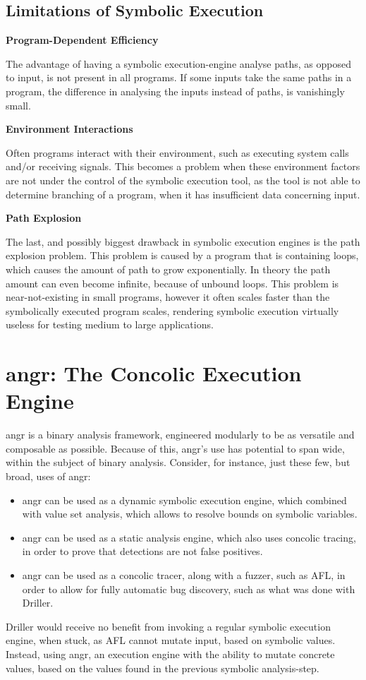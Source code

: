 \documentclass[a4paper]{article}
\newcommand{\tbf}[1]{\textbf{#1}}
\newcommand{\subsubsubsection}[1]{\tbf{#1}}
\newcommand{\marginwidth}{0.5cm}
\begin{document}
\subsection{Limitations of Symbolic Execution}
\label{sec:LimitsSymEx}
\subsubsubsection{Program-Dependent Efficiency}
\begin{addmargin}[\marginwidth]{0cm}
The advantage of having a symbolic execution-engine analyse paths, as opposed to input, is not present in all programs. If some inputs take the same paths in a program, the difference in analysing the inputs instead of paths, is vanishingly small.
\end{addmargin}
\subsubsubsection{Environment Interactions}
\begin{addmargin}[\marginwidth]{0cm}
Often programs interact with their environment, such as executing system calls and/or receiving signals. This becomes a problem when these environment factors are not under the control of the symbolic execution tool, as the tool is not able to determine branching of a program, when it has insufficient data concerning input.
\end{addmargin}
\subsubsubsection{Path Explosion}
\begin{addmargin}[\marginwidth]{0cm}
The last, and possibly biggest drawback in symbolic execution engines is the path explosion problem. This problem is caused by a program that is containing loops, which causes the amount of path to grow exponentially. In theory the path amount can even become infinite, because of unbound loops. This problem is near-not-existing in small programs, however it often scales faster than the symbolically executed program scales, rendering symbolic execution virtually useless for testing medium to large applications.
\end{addmargin}
\section{angr: The Concolic Execution Engine}
\label{sec:angr}
angr is a binary analysis framework, engineered modularly to be as versatile and composable as possible. Because of this, angr's use has potential to span wide, within the subject of binary analysis. Consider, for instance, just these few, but broad, uses of angr:
\begin{itemize}
	\item angr can be used as a dynamic symbolic execution engine, which combined with value set analysis, which allows to resolve bounds on symbolic variables.
	\item angr can be used as a static analysis engine, which also uses concolic tracing, in order to prove that detections are not false positives.
	\item angr can be used as a concolic tracer, along with a fuzzer, such as AFL, in order to allow for fully automatic bug discovery, such as what was done with Driller.
\end{itemize}
Driller would receive no benefit from invoking a regular symbolic execution engine, when stuck, as AFL cannot mutate input, based on symbolic values. Instead, using angr, an execution engine with the ability to mutate concrete values, based on the values found in the previous symbolic analysis-step.
\end{document}
